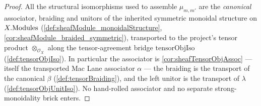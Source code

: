 \begin{proof}
  \leanok
  All the structural isomorphisms used to assemble \(\mu_{m,m'}\) are the
  \emph{canonical} associator, braiding and unitors of the inherited symmetric
  monoidal structure on \(X.\mathrm{Modules}\) (\cref{def:sheafModule_monoidalStructure},
  \cref{cor:sheafModule_braided_symmetric}), transported to the project's tensor
  product \(\otimes_{\mathcal{O}_X}\) along the tensor-agreement bridge
  \(\mathrm{tensorObjIso}\) (\cref{def:tensorObjIso}). In particular the associator
  is \cref{cor:sheafTensorObjAssoc} --- itself the transported Mac Lane associator
  \(\alpha\) --- the braiding is the transport of the canonical \(\beta\)
  (\cref{def:tensorBraiding}), and the left unitor is the transport of \(\lambda\)
  (\cref{def:tensorObjUnitIso}). No hand-rolled associator and no separate
  strong-monoidality brick enters.


\end{proof}
